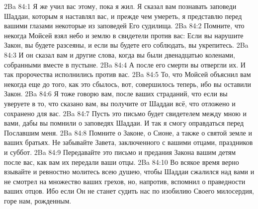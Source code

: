 \vs 2Ba 84:1
Я же учил вас этому, пока я жил. Я сказал вам познавать заповеди Шаддаи, которым я наставлял вас, и прежде чем умереть, я представлю перед вашими глазами некоторые из заповедей Его судилища.
\vs 2Ba 84:2
Помните, что некогда Мойсей взял небо и землю в свидетели против вас: Если вы нарушите Закон, вы будете разсеяны, и если вы будете его соблюдать, вы укрепитесь.
\vs 2Ba 84:3
И он сказал вам и другие слова, когда вы были двенадцатью коленами, собранными вместе в пустыне.
\vs 2Ba 84:4
А после его смерти вы отвергли их. И так пророчества исполнились против вас.
\vs 2Ba 84:5
То, что Мойсей объяснил вам некогда еще до того, как это сбылось, вот, совершилось теперь, ибо вы оставили Закон.
\vs 2Ba 84:6
Я тоже говорю вам, после ваших страданий, что если вы уверуете в то, что сказано вам, вы получите от Шаддаи всё, что отложено и сохранено для вас.
\vs 2Ba 84:7
Пусть это письмо будет свидетелем между мною и вами, дабы вы помнили о заповедях Шаддаи. И так я смогу оправдаться перед Пославшим меня.
\vs 2Ba 84:8
Помните о Законе, о Сионе, а также о святой земле и ваших братьях. Не забывайте Завета, заключенного с вашими отцами, праздников и суббот.
\vs 2Ba 84:9
Передавайте это письмо и предания Закона вашим детям после вас, как вам их передали ваши отцы.
\vs 2Ba 84:10
Во всякое время верно взывайте и ревностно молитесь всею душею, чтобы Шаддаи сжалился над вами и не смотрел на множество ваших грехов, но, напротив, вспомнил о праведности ваших отцов. Ибо если Он не станет судить нас по изобилию Своего милосердия, горе нам, рожденным.

